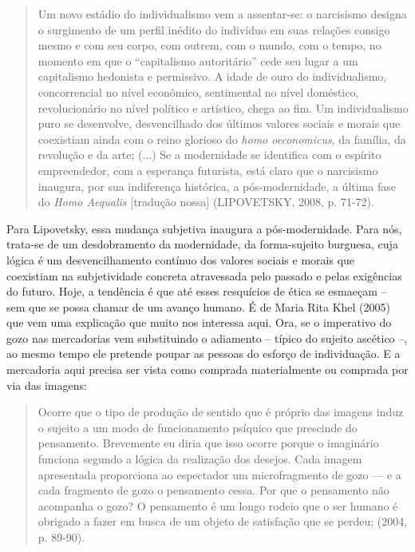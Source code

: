 \begin{quote}
Um novo estádio do individualismo vem a assentar-se: o narcisismo
designa o surgimento de um perfil inédito do indivíduo em suas relações
consigo mesmo e com seu corpo, com outrem, com o mundo, com o tempo, no
momento em que o ``capitalismo autoritário'' cede seu lugar a um
capitalismo hedonista e permissivo. A idade de ouro do individualismo,
concorrencial no nível econômico, sentimental no nível doméstico,
revolucionário no nível político e artístico, chega ao fim. Um
individualismo puro se desenvolve, desvencilhado dos últimos valores
sociais e morais que coexistiam ainda com o reino glorioso do \emph{homo
oeconomicus}, da família, da revolução e da arte; (...) Se a modernidade
se identifica com o espírito empreendedor, com a esperança futurista,
está claro que o narcisismo inaugura, por sua indiferença histórica, a
pós-modernidade, a última fase do \emph{Homo Aequalis} {[}tradução
nossa{]} (LIPOVETSKY, 2008, p. 71-72).
\end{quote}

Para Lipovetsky, essa mudança subjetiva inaugura a pós-modernidade. Para
nós, trata-se de um desdobramento da modernidade, da forma-sujeito
burguesa, cuja lógica é um desvencilhamento contínuo dos valores sociais
e morais que coexistiam na subjetividade concreta atravessada pelo
passado e pelas exigências do futuro. Hoje, a tendência é que até esses
resquícios de ética se esmaeçam -- sem que se possa chamar de um avanço
humano. É de Maria Rita Khel (2005) que vem uma explicação que muito nos
interessa aqui. Ora, se o imperativo do gozo nas mercadorias vem
substituindo o adiamento -- típico do sujeito ascético --, ao mesmo
tempo ele pretende poupar as pessoas do esforço de individuação. E a
mercadoria aqui precisa ser vista como comprada materialmente ou
comprada por via das imagens:

\begin{quote}
Ocorre que o tipo de produção de sentido que é próprio das imagens induz
o sujeito a um modo de funcionamento psíquico que prescinde do
pensamento. Brevemente eu diria que isso ocorre porque o imaginário
funciona segundo a lógica da realização dos desejos. Cada imagem
apresentada proporciona ao espectador um microfragmento de gozo --- e a
cada fragmento de gozo o pensamento cessa. Por que o pensamento não
acompanha o gozo? O pensamento é um longo rodeio que o ser humano é
obrigado a fazer em busca de um objeto de satisfação que se perdeu;
(2004, p. 89-90).
\end{quote}

